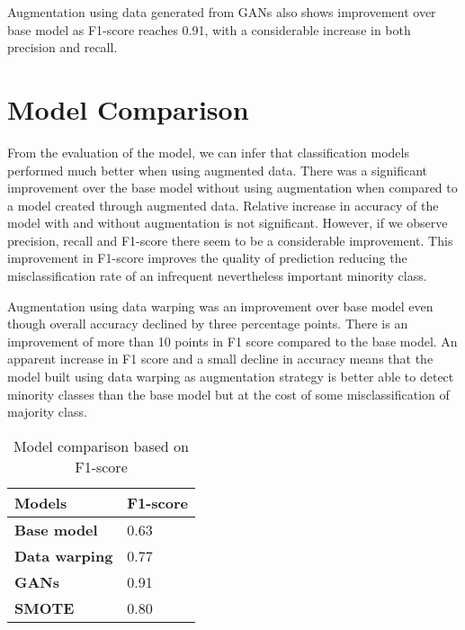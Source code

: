 Augmentation using data generated from GANs also shows improvement over base model as F1-score reaches 0.91, with a considerable increase in both precision and recall.

\section{Model Comparison}

From the evaluation of the model, we can infer that classification models performed much better when using augmented data. There was a significant improvement over the base model without using augmentation when compared to a model created through augmented data. Relative increase in accuracy of the model with and without augmentation is not significant. However, if we observe precision, recall and F1-score there seem to be a considerable improvement. This improvement in F1-score improves the quality of prediction reducing the misclassification rate of an infrequent nevertheless important minority class. 

Augmentation using data warping was an improvement over base model even though overall accuracy declined by three percentage points. There is an improvement of more than 10 points in F1 score compared to the base model. An apparent increase in F1 score and a small decline in accuracy means that the model built using data warping as augmentation strategy is better able to detect minority classes than the base model but at the cost of some misclassification of majority class.

\begin{table}[ht]
	\centering
	\caption{Model comparison based on F1-score}
	\label{table:Model comparison}
	\begin{tabular}{|p{4cm}|p{2cm}|} 
		\hline %
		\textbf{Models} & \textbf{F1-score}\\ 
		\hline
		\textbf{Base model} & 0.63  \\ 
		\textbf{Data warping} & 0.77  \\ 
		\rowcolor{gray!15}\textbf{GANs} & 0.91 \\ 
		\textbf{SMOTE} & 0.80 \\ 
		
		
		\hline		
	\end{tabular} %
	
\end{table} %

